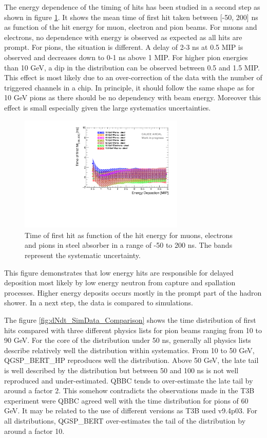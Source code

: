 The energy dependence of the timing of hits has been studied in a second step as shown in figure \ref{fig:Energy_Comparison}. It shows the mean time of first hit taken between [-50, 200] ns as function of the hit energy for muon, electron and pion beams. For muons and electrons, no dependence with energy is observed as expected as all hits are prompt. For pions, the situation is different. A delay of 2-3 ns at 0.5 MIP is observed and decreases down to 0-1 ns above 1 MIP. For higher pion energies than 10 GeV, a dip in the distribution can be observed between 0.5 and 1.5 MIP. This effect is most likely due to an over-correction of the data with the number of triggered channels in a chip. In principle, it should follow the same shape as for 10 GeV pions as there should be no dependency with beam energy. Moreover this effect is small especially given the large systematics uncertainties.

\begin{figure}[htbp!]
	\centering
	\includegraphics[width=0.7\textwidth]{chap5/fig_AHCAL_timing/Pions/Timing_Energy_Comparison_ShortAsymRange.pdf}
	\caption{Time of first hit as function of the hit energy for muons, electrons and pions in steel absorber in a range of -50 to 200 ns. The bands represent the systematic uncertainty.}
	\label{fig:Energy_Comparison}
\end{figure}

This figure demonstrates that low energy hits are responsible for delayed deposition most likely by low energy neutron from capture and spallation processes. Higher energy deposits occurs mostly in the prompt part of the hadron shower. In a next step, the data is compared to simulations.

The figure \ref{fig:dNdt_SimData_Comparison} shows the time distribution of first hits compared with three different physics lists for pion beams ranging from 10 to 90 GeV. For the core of the distribution under 50 ns, generally all physics lists describe relatively well the distribution within systematics. From 10 to 50 GeV, QGSP\_BERT\_HP reproduces well the distribution. Above 50 GeV, the late tail is well described by the distribution but between 50 and 100 ns is not well reproduced and under-estimated. QBBC tends to over-estimate the late tail by around a factor 2. This somehow contradicts the observations made in the T3B experiment were QBBC agreed well with the time distribution for pions of 60 GeV. It may be related to the use of different \geant versions as T3B used \geant v9.4p03. For all distributions, QGSP\_BERT over-estimates the tail of the distribution by around a factor 10.

